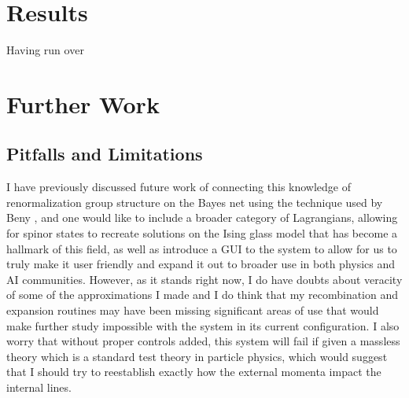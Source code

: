 \documentclass{article}
\begin{document}
\section{Results}
Having run over 

\section{Further Work}

\subsection{Pitfalls and Limitations}
I have previously discussed future work of connecting this knowledge of renormalization group structure on the Bayes net using the technique used by Beny \cite{Beny2013}, and one would like to include a broader category of Lagrangians, allowing for spinor states to recreate solutions on the Ising glass model that has become a hallmark of this field, as well as introduce a GUI to the system to allow for us to truly make it user friendly and expand it out to broader use in both physics and AI communities. 
However, as it stands right now, I do have doubts about veracity of some of the approximations I made and I do think that my recombination and expansion routines may have been missing significant areas of use that would make further study impossible with the system in its current configuration. I also worry that without proper controls added, this system will fail if given a massless theory which is a standard test theory in particle physics, which would suggest that I should try to reestablish exactly how the external momenta impact the internal lines. 


\end{document}
